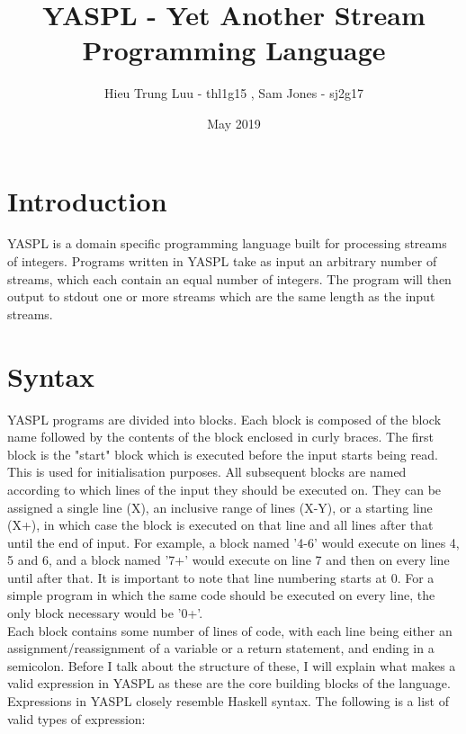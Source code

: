 \documentclass{article}
\title{YASPL - Yet Another Stream Programming Language}
\author{Hieu Trung Luu - thl1g15 , Sam Jones - sj2g17}
\date{May 2019}
\begin{document}
\maketitle

\section{Introduction}
YASPL is a domain specific programming language built for processing streams of integers. Programs written in YASPL take as input an arbitrary number of streams, which each contain an equal number of integers. The program will then output to stdout one or more streams which are the same length as the input streams.
\section{Syntax}
YASPL programs are divided into blocks. Each block is composed of the block name followed by the contents of the block enclosed in curly braces. The first block is the "start" block which is executed before the input starts being read. This is used for initialisation purposes. All subsequent blocks are named according to which lines of the input they should be executed on. They can be assigned a single line (X), an inclusive range of lines (X-Y), or a starting line (X+), in which case the block is executed on that line and all lines after that until the end of input. For example, a block named '4-6' would execute on lines 4, 5 and 6, and a block named '7+' would execute on line 7 and then on every line until after that. It is important to note that line numbering starts at 0. For a simple program in which the same code should be executed on every line, the only block necessary would be '0+'.
\\
Each block contains some number of lines of code, with each line being either an assignment/reassignment of a variable or a return statement, and ending in a semicolon. Before I talk about the structure of these, I will explain what makes a valid expression in YASPL as these are the core building blocks of the language.
\\
Expressions in YASPL closely resemble Haskell syntax. The following is a list of valid types of expression:
\end{document}
